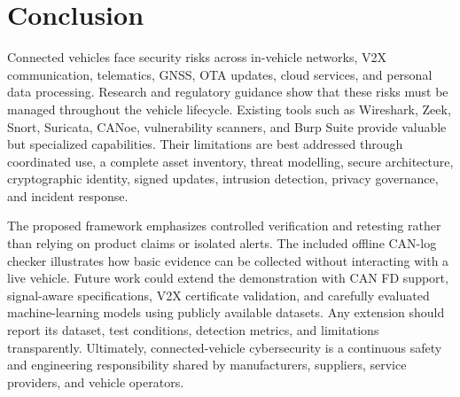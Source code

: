 \documentclass[11pt]{article}
\begin{document}
\section{Conclusion}
Connected vehicles face security risks across in-vehicle networks, V2X communication, telematics, GNSS, OTA updates, cloud services, and personal data processing. Research and regulatory guidance show that these risks must be managed throughout the vehicle lifecycle. Existing tools such as Wireshark, Zeek, Snort, Suricata, CANoe, vulnerability scanners, and Burp Suite provide valuable but specialized capabilities. Their limitations are best addressed through coordinated use, a complete asset inventory, threat modelling, secure architecture, cryptographic identity, signed updates, intrusion detection, privacy governance, and incident response.

The proposed framework emphasizes controlled verification and retesting rather than relying on product claims or isolated alerts. The included offline CAN-log checker illustrates how basic evidence can be collected without interacting with a live vehicle. Future work could extend the demonstration with CAN FD support, signal-aware specifications, V2X certificate validation, and carefully evaluated machine-learning models using publicly available datasets. Any extension should report its dataset, test conditions, detection metrics, and limitations transparently. Ultimately, connected-vehicle cybersecurity is a continuous safety and engineering responsibility shared by manufacturers, suppliers, service providers, and vehicle operators.



\end{document}
